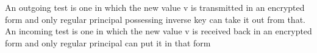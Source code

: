 \documentclass[12pt]{report}
\begin{document}
\clearpage
\tableofcontents

\listoffigures
\listoftables

\clearpage

\setcounter{page}{1}








An outgoing test is one in which the new value v is transmitted in an encrypted form and only regular principal possessing inverse key can take it out from that. An incoming test is one in which the new value v is received back in an encrypted form and only regular principal can put it in that form
\end{document}
